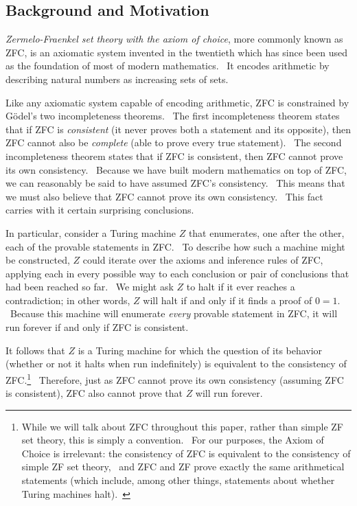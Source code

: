 \documentclass[11pt]{article}
\begin{document}
\subsection{Background and Motivation \label{sec:background}}

\emph{Zermelo-Fraenkel set theory with the axiom of choice}, more commonly known as ZFC, is an axiomatic system invented in the twentieth which has since been used as the foundation of most of modern mathematics. \ It encodes arithmetic by describing natural numbers as increasing sets of sets.

Like any axiomatic system capable of encoding arithmetic, ZFC is constrained by G\"{o}del's two incompleteness theorems. \ The first incompleteness theorem states that if ZFC is \emph{consistent} (it never proves both a statement and its opposite), then ZFC cannot also be \emph{complete} (able to prove every true statement). \ The second incompleteness theorem states that if ZFC is consistent, then ZFC cannot prove its own consistency. \ Because we have built modern mathematics on top of ZFC, we can reasonably be said to have assumed ZFC's consistency. \ This means that we must also believe that ZFC cannot prove its own consistency. \ This fact carries with it certain surprising conclusions.

In particular, consider a Turing machine $Z$ that enumerates, one after the other, each of the provable statements in ZFC. \ To describe how such a machine might be constructed, $Z$ could iterate over the axioms and inference rules of ZFC, applying each in every possible way to each conclusion or pair of conclusions that had been reached so far. \ We might ask $Z$ to halt if it ever reaches a contradiction; in other words, $Z$ will halt if and only if it finds a proof of $0 = 1$. \ Because this machine will enumerate \emph{every} provable statement in ZFC, it will run forever if and only if ZFC is consistent.

It follows that $Z$ is a Turing machine for which the question of its behavior (whether or not it halts when run indefinitely) is equivalent to the consistency of ZFC.\footnote{While we will talk about ZFC throughout this paper, rather than simple ZF set theory, this is simply a convention. \ For our purposes, the Axiom of Choice is irrelevant: the consistency of ZFC is equivalent to the consistency of simple ZF set theory,~\cite{godelcohen} and ZFC and ZF prove exactly the same arithmetical statements (which include, among other things, statements about whether Turing machines halt).~\cite{schoenfield}} \ Therefore, just as ZFC cannot prove its own consistency (assuming ZFC is consistent), ZFC also cannot prove that $Z$ will run forever.
\end{document}
